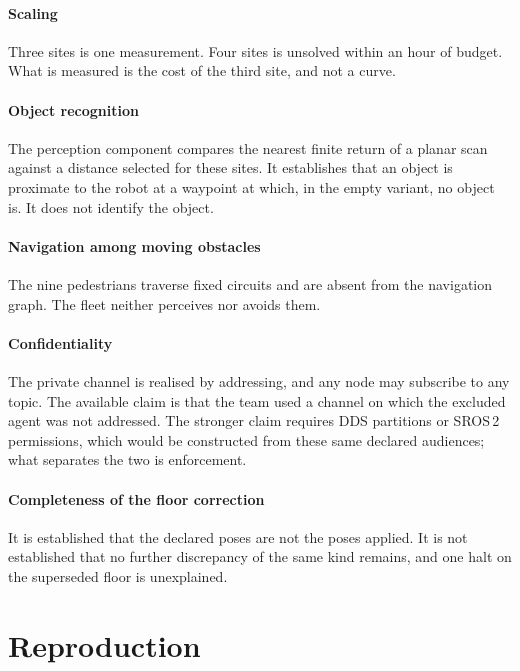 \documentclass[11pt,a4paper]{article}
\theoremstyle{definition}
\begin{document}
\paragraph{Scaling} Three sites is one measurement. Four sites is unsolved
within an hour of budget. What is measured is the cost of the third site, and
not a curve.

\paragraph{Object recognition} The perception component compares the nearest
finite return of a planar scan against a distance selected for these sites. It
establishes that an object is proximate to the robot at a waypoint at which, in
the empty variant, no object is. It does not identify the object.

\paragraph{Navigation among moving obstacles} The nine pedestrians traverse
fixed circuits and are absent from the navigation graph. The fleet neither
perceives nor avoids them.

\paragraph{Confidentiality} The private channel is realised by addressing, and
any node may subscribe to any topic. The available claim is that the team used
a channel on which the excluded agent was not addressed. The stronger claim
requires DDS partitions or SROS\,2 permissions, which would be constructed from
these same declared audiences; what separates the two is enforcement.

\paragraph{Completeness of the floor correction} It is established that the
declared poses are not the poses applied. It is not established that no further
discrepancy of the same kind remains, and one halt on the superseded floor is
unexplained.

\section*{Reproduction}
\end{document}
